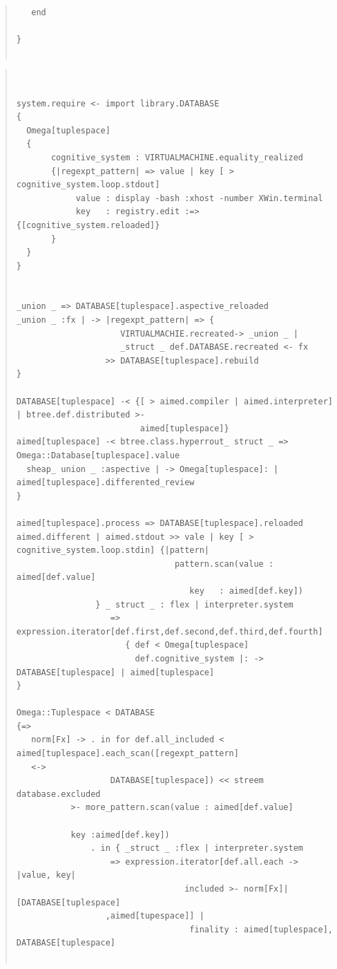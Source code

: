 \documentclass{jsarticle}
\begin{document}
{\begin{quote}
\begin{verbatim}
   end                    
                       
}


\end{verbatim}
\end{quote}

\begin{quote}
\setlength{\baselineskip}{12pt}
\begin{verbatim}


system.require <- import library.DATABASE
{
  Omega[tuplespace]
  { 
       cognitive_system : VIRTUALMACHINE.equality_realized
       {|regexpt_pattern| => value | key [ > cognitive_system.loop.stdout]
            value : display -bash :xhost -number XWin.terminal
            key   : registry.edit :=> {[cognitive_system.reloaded]}
       }
  }
}


_union _ => DATABASE[tuplespace].aspective_reloaded
_union _ :fx | -> |regexpt_pattern| => { 
                     VIRTUALMACHIE.recreated-> _union _ |
                     _struct _ def.DATABASE.recreated <- fx
                  >> DATABASE[tuplespace].rebuild
}

DATABASE[tuplespace] -< {[ > aimed.compiler | aimed.interpreter] | btree.def.distributed >-
                         aimed[tuplespace]}
aimed[tuplespace] -< btree.class.hyperrout_ struct _ => Omega::Database[tuplespace].value
  sheap_ union _ :aspective | -> Omega[tuplespace]: | aimed[tuplespace].differented_review
}

aimed[tuplespace].process => DATABASE[tuplespace].reloaded
aimed.different | aimed.stdout >> vale | key [ > cognitive_system.loop.stdin] {|pattern|
                                pattern.scan(value : aimed[def.value]
                                   key   : aimed[def.key])
                } _ struct _ : flex | interpreter.system
                   => expression.iterator[def.first,def.second,def.third,def.fourth]
                      { def < Omega[tuplespace]
                        def.cognitive_system |: -> DATABASE[tuplespace] | aimed[tuplespace] 
}                   

Omega::Tuplespace < DATABASE                      
{=>
   norm[Fx] -> . in for def.all_included < aimed[tuplespace].each_scan([regexpt_pattern] 
   <->
                   DATABASE[tuplespace]) << streem database.excluded 
		   >- more_pattern.scan(value : aimed[def.value]
                                                                       
		   key :aimed[def.key])
               . in { _struct _ :flex | interpreter.system
                   => expression.iterator[def.all.each -> |value, key| 
                                  included >- norm[Fx]|[DATABASE[tuplespace]
				  ,aimed[tupespace]] |
                                   finality : aimed[tuplespace], DATABASE[tuplespace] 
				   

\end{verbatim}
\end{quote}}
\end{document}
